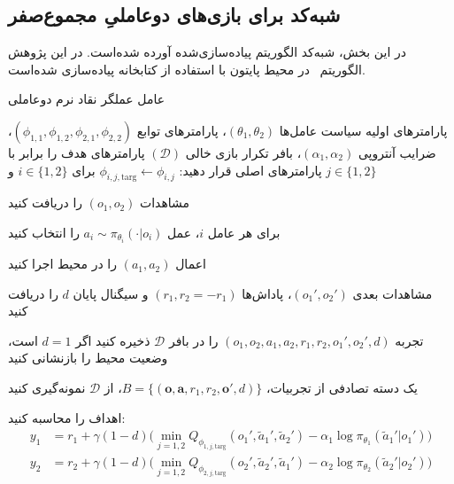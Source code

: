 \subsection{شبه‌کد  برای بازی‌های دو­عاملیِ مجموع­‌صفر}

در این بخش، شبه‌کد الگوریتم  پیاده‌سازی‌شده آورده شده‌است. در این پژوهش الگوریتم~ در محیط پایتون با استفاده از کتابخانه  \cite{paszke2017automatic} پیاده‌سازی شده‌است.

\begin{algorithm}[H]
    \caption{عامل عملگر نقاد نرم دو­عاملی}\label{alg:MASAC}
    \begin{algorithmic}[1]
         پارامترهای اولیه سیاست عامل‌ها $(\theta_1, \theta_2)$، پارامترهای توابع  $(\phi_{1,1}, \phi_{1,2}, \phi_{2,1}, \phi_{2,2})$، ضرایب آنتروپی $(\alpha_1, \alpha_2)$، بافر تکرار بازی خالی $(\mathcal{D})$
        \State پارامترهای هدف را برابر با پارامترهای اصلی قرار دهید: 
        \Statex \hspace{\algorithmicindent}
        $\phi_{i,j,\text{targ}} \leftarrow \phi_{i,j}$ برای $i \in \{1, 2\}$ و $j \in \{1, 2\}$
        
            \State \parbox[t]{\dimexpr\linewidth-\algorithmicindent}{
            مشاهدات $(o_1, o_2)$ را دریافت کنید
            \strut}
            \State \parbox[t]{\dimexpr\linewidth-\algorithmicindent}{
            برای هر عامل $i$، عمل $a_i \sim \pi_{\theta_i}(\cdot|o_i)$ را انتخاب کنید
            \strut}
            \State اعمال $(a_1, a_2)$ را در محیط اجرا کنید
            \State \parbox[t]{\dimexpr\linewidth-\algorithmicindent}{
            مشاهدات بعدی $(o_1', o_2')$، پاداش‌ها $(r_1, r_2=-r_1)$ و سیگنال پایان $d$ را دریافت کنید
            \strut}
            \State تجربه $(o_1, o_2, a_1, a_2, r_1, r_2, o_1', o_2', d)$ را در بافر $\mathcal{D}$ ذخیره کنید
            \State اگر $d=1$ است، وضعیت محیط را بازنشانی کنید
            
                    \State \parbox[t]{\dimexpr\linewidth-\algorithmicindent}{
                    یک دسته تصادفی از تجربیات، $B = \{(\boldsymbol{o}, \boldsymbol{a}, r_1, r_2, \boldsymbol{o}', d)\}$، از $\mathcal{D}$ نمونه‌گیری کنید
                    \strut}
                    \State اهداف را محاسبه کنید:
                     \vspace{-15pt}
                    \begin{align*}
                        y_1 &= r_1 + \gamma (1-d) \Big(\min_{j=1,2} Q_{\phi_{1,j,\text{targ}}}(o_1', \tilde{a}_1', \tilde{a}_2') - \alpha_1 \log \pi_{\theta_1}(\tilde{a}_1'|o_1') \Big) \\
                        y_2 &= r_2 + \gamma (1-d) \Big(\min_{j=1,2} Q_{\phi_{2,j,\text{targ}}}(o_2', \tilde{a}_2', \tilde{a}_1') - \alpha_2 \log \pi_{\theta_2}(\tilde{a}_2'|o_2') \Big)
                    \end{align*}
                    \vspace{-35pt}
                    

\end{algorithmic}
\end{algorithm}
